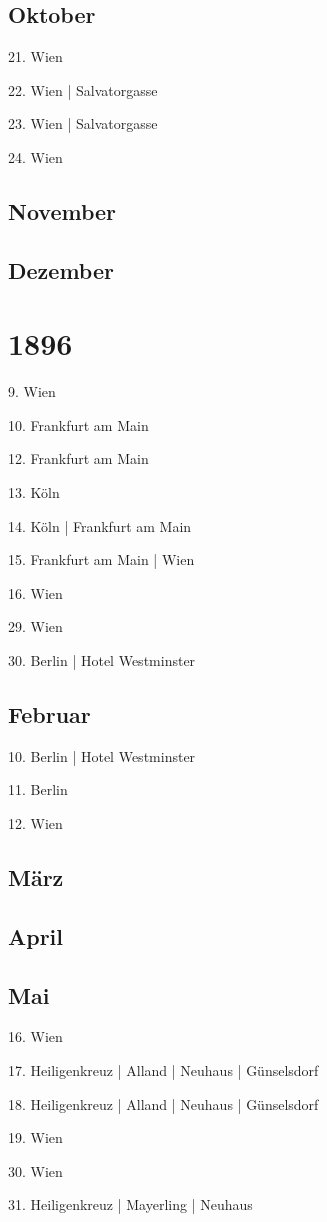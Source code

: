 \documentclass[twoside=false,titlepage=false,open=any, parskip=never, fontsize=10pt, headings=small, chapterprefix=false, appendixprefix=false, DIV=15]{scrbook}
\begin{document}
\begin{multicols}{3}
            \section*{Oktober}
            21. Wien\par
            22. Wien | Salvatorgasse\par
            23. Wien | Salvatorgasse\par
            24. Wien\par
            \section*{November}
            \section*{Dezember}
            \chapter*{1896}
            9. Wien\par
            10. Frankfurt am Main\par
            12. Frankfurt am Main\par
            13. Köln\par
            14. Köln | Frankfurt am Main\par
            15. Frankfurt am Main | Wien\par
            16. Wien\par
            29. Wien\par
            30. Berlin | Hotel Westminster\par
            \section*{Februar}
            10. Berlin | Hotel Westminster\par
            11. Berlin\par
            12. Wien\par
            \section*{März}
            \section*{April}
            \section*{Mai}
            16. Wien\par
            17. Heiligenkreuz | Alland | Neuhaus | Günselsdorf\par
            18. Heiligenkreuz | Alland | Neuhaus | Günselsdorf\par
            19. Wien\par
            30. Wien\par
            31. Heiligenkreuz | Mayerling | Neuhaus\par

\end{multicols}
\end{document}
